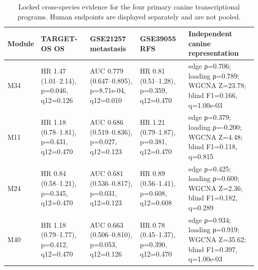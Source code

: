 \begin{table}[t]
\centering
\small
\caption{Locked cross-species evidence for the four primary canine transcriptional programs. Human endpoints are displayed separately and are not pooled.}
\begin{tabular}{p{} p{} p{} p{} p{}}
\hline
Module & TARGET-OS OS & GSE21257 metastasis & GSE39055 RFS & Independent canine representation \\
\hline
M34 & HR 1.47 (1.01–2.14), p=0.046, q12=0.126 & AUC 0.779 (0.647–0.895), p=8.71e-04, q12=0.010 & HR 0.81 (0.51–1.28), p=0.359, q12=0.470 & edge ρ=0.706; loading ρ=0.789; WGCNA Z=23.78; blind F1=0.166, q=1.00e-03 \\
M11 & HR 1.18 (0.78–1.81), p=0.431, q12=0.470 & AUC 0.686 (0.519–0.836), p=0.027, q12=0.123 & HR 1.21 (0.79–1.87), p=0.381, q12=0.470 & edge ρ=0.379; loading ρ=-0.200; WGCNA Z=4.48; blind F1=0.118, q=0.815 \\
M24 & HR 0.84 (0.58–1.21), p=0.345, q12=0.470 & AUC 0.681 (0.536–0.817), p=0.031, q12=0.123 & HR 0.89 (0.56–1.41), p=0.608, q12=0.608 & edge ρ=0.425; loading ρ=0.600; WGCNA Z=2.36; blind F1=0.182, q=0.289 \\
M40 & HR 1.18 (0.79–1.77), p=0.412, q12=0.470 & AUC 0.663 (0.506–0.810), p=0.053, q12=0.126 & HR 0.78 (0.45–1.37), p=0.390, q12=0.470 & edge ρ=0.934; loading ρ=0.919; WGCNA Z=35.62; blind F1=0.397, q=1.00e-03 \\
\hline
\end{tabular}
\end{table}
